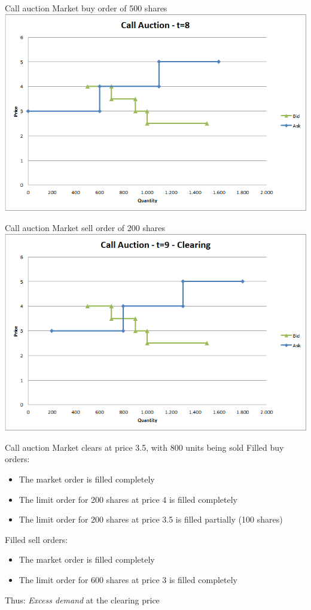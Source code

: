 \documentclass[english,10pt]{beamer}
\theoremstyle{definition}
\begin{document}
\begin{frame}{Call auction}
	Market buy order of 500 shares
	\quad
	\center
	\includegraphics[width=.75\linewidth]{pics/Call_t8}
\end{frame}


\begin{frame}{Call auction}
	Market sell order of 200 shares
	\quad
	\center
	\includegraphics[width=.75\linewidth]{pics/Call_Clearing}
\end{frame}


\begin{frame}{Call auction}
	Market clears at price 3.5, with 800 units being sold
	Filled buy orders:
	\begin{itemize}
		\item The market order is filled completely
		\item The limit order for 200 shares at price 4 is filled completely
		\item The limit order for 200 shares at price 3.5 is filled partially (100 shares)
	\end{itemize}
	Filled sell orders:
	\begin{itemize}
		\item The market order is filled completely
		\item The limit order for 600 shares at price 3 is filled completely
	\end{itemize}
	Thus: \textit{Excess demand} at the clearing price
\end{frame}
\end{document}
